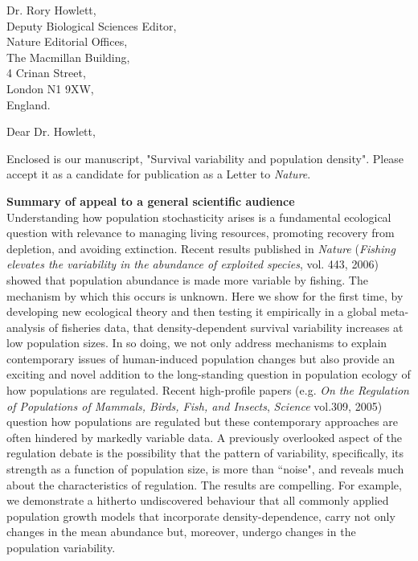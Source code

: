 \documentclass[a4paper,12pt]{letter}
\begin{document}
\begin{letter}{Dr. Rory Howlett,\\Deputy Biological Sciences Editor,\\
Nature Editorial Offices,\\The Macmillan Building,\\ 4 Crinan Street, \\ London N1 9XW,  \\ England.}

\opening{Dear Dr. Howlett,} %

Enclosed is our manuscript, "Survival variability and population density". Please accept it as a candidate for publication as a Letter to \textit{Nature}.

{\bf Summary of appeal to a general scientific audience}\\
Understanding how population stochasticity arises is a fundamental ecological question with relevance to managing living resources, promoting recovery from depletion, and avoiding extinction. Recent results published in \textit{Nature} (\textit{Fishing elevates the variability in the abundance of exploited species}, vol. 443, 2006) showed that population abundance is made more variable by fishing. The mechanism by which this occurs is unknown. Here we show for the first time, by developing new ecological theory and then testing it empirically in a global meta-analysis of fisheries data, that density-dependent survival variability increases at low population sizes. In so doing, we not only address mechanisms to explain contemporary issues of human-induced population changes but also provide an exciting and novel addition to the long-standing question in population ecology of how populations are regulated. Recent high-profile papers (e.g. \textit{On the Regulation of Populations of Mammals, Birds, Fish, and Insects}, \textit{Science} vol.309, 2005) question how populations are regulated but these contemporary approaches are often hindered by markedly variable data. A previously overlooked aspect of the regulation debate is the
possibility that the pattern of variability, specifically, its strength as a
function of population size, is more than ``noise", and reveals much about the characteristics of regulation. The results are compelling. For example, we demonstrate a hitherto undiscovered behaviour that all commonly applied population growth models that incorporate density-dependence, carry not only changes in the mean abundance but, moreover, undergo changes in the population variability. 

\end{letter}
\end{document}
